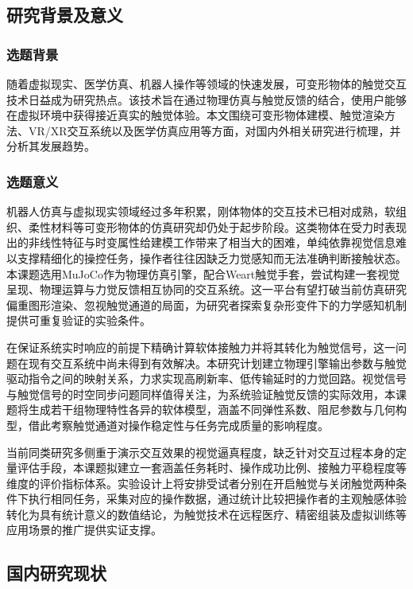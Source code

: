 \subsection{研究背景及意义}

\subsubsection{选题背景}

随着虚拟现实、医学仿真、机器人操作等领域的快速发展，可变形物体的触觉交互技术日益成为研究热点。该技术旨在通过物理仿真与触觉反馈的结合，使用户能够在虚拟环境中获得接近真实的触觉体验。本文围绕可变形物体建模、触觉渲染方法、VR/XR交互系统以及医学仿真应用等方面，对国内外相关研究进行梳理，并分析其发展趋势。

\subsubsection{选题意义}

机器人仿真与虚拟现实领域经过多年积累，刚体物体的交互技术已相对成熟，软组织、柔性材料等可变形物体的仿真研究却仍处于起步阶段。这类物体在受力时表现出的非线性特征与时变属性给建模工作带来了相当大的困难，单纯依靠视觉信息难以支撑精细化的操控任务，操作者往往因缺乏力觉感知而无法准确判断接触状态。本课题选用MuJoCo作为物理仿真引擎，配合Weart触觉手套，尝试构建一套视觉呈现、物理运算与力觉反馈相互协同的交互系统。这一平台有望打破当前仿真研究偏重图形渲染、忽视触觉通道的局面，为研究者探索复杂形变件下的力学感知机制提供可重复验证的实验条件。

    在保证系统实时响应的前提下精确计算软体接触力并将其转化为触觉信号，这一问题在现有交互系统中尚未得到有效解决。本研究计划建立物理引擎输出参数与触觉驱动指令之间的映射关系，力求实现高刷新率、低传输延时的力觉回路。视觉信号与触觉信号的时空同步问题同样值得关注，为系统验证触觉反馈的实际效用，本课题将生成若干组物理特性各异的软体模型，涵盖不同弹性系数、阻尼参数与几何构型，借此考察触觉通道对操作稳定性与任务完成质量的影响程度。

    当前同类研究多侧重于演示交互效果的视觉逼真程度，缺乏针对交互过程本身的定量评估手段，本课题拟建立一套涵盖任务耗时、操作成功比例、接触力平稳程度等维度的评价指标体系。实验设计上将安排受试者分别在开启触觉与关闭触觉两种条件下执行相同任务，采集对应的操作数据，通过统计比较把操作者的主观触感体验转化为具有统计意义的数值结论，为触觉技术在远程医疗、精密组装及虚拟训练等应用场景的推广提供实证支撑。

\subsection{国内研究现状}

